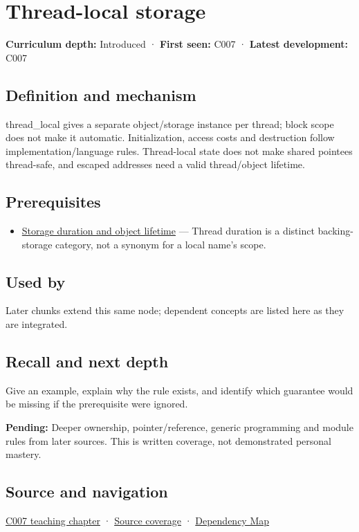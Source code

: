 \hypertarget{appendix-3b88c6cd7195}{}\label{referencestart:appendix-3b88c6cd7195}
\section{Thread-local storage}\label{appendix-3b88c6cd7195-thread-local-storage}

\textbf{Curriculum depth:} Introduced · \textbf{First seen:} C007 · \textbf{Latest development:} C007

\subsection{Definition and mechanism}\label{appendix-3b88c6cd7195-definition-and-mechanism}

thread\_local gives a separate object/storage instance per thread; block scope does not make it automatic. Initialization, access costs and destruction follow implementation/language rules. Thread-local state does not make shared pointees thread-safe, and escaped addresses need a valid thread/object lifetime.

\subsection{Prerequisites}\label{appendix-3b88c6cd7195-prerequisites}

\begin{itemize}
\tightlist
\item
  \hyperref[appendix-0b104bcba06b]{Storage duration and object lifetime} --- Thread duration is a distinct backing-storage category, not a synonym for a local name's scope.
\end{itemize}

\subsection{Used by}\label{appendix-3b88c6cd7195-used-by}

Later chunks extend this same node; dependent concepts are listed here as they are integrated.

\subsection{Recall and next depth}\label{appendix-3b88c6cd7195-recall-and-next-depth}

Give an example, explain why the rule exists, and identify which guarantee would be missing if the prerequisite were ignored.

\textbf{Pending:} Deeper ownership, pointer/reference, generic programming and module rules from later sources. This is written coverage, not demonstrated personal mastery.

\subsection{Source and navigation}\label{appendix-3b88c6cd7195-source-and-navigation}

\hyperref[01-foundations-i-ch002-a-name-does-not-decide-how-long-storage-lasts]{C007 teaching chapter} · \hyperref[appendix-fd090d982a15-m007---parts-101-112]{Source coverage} · \hyperref[appendix-4ad47bdd269a]{Dependency Map}
